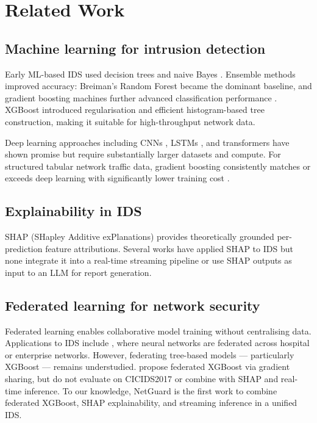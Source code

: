 \documentclass[review]{elsarticle}  %
\begin{document}
\section{Related Work}
\label{sec:related}

\subsection{Machine learning for intrusion detection}

Early ML-based IDS used decision trees and naive Bayes \cite{ref2}.
Ensemble methods improved accuracy: Breiman's Random Forest \cite{ref3}
became the dominant baseline, and gradient boosting machines further
advanced classification performance \cite{ref4}. XGBoost \cite{ref5}
introduced regularisation and efficient histogram-based tree construction,
making it suitable for high-throughput network data.

Deep learning approaches including CNNs \cite{ref6}, LSTMs \cite{ref7},
and transformers \cite{ref8} have shown promise but require substantially
larger datasets and compute. For structured tabular network traffic data,
gradient boosting consistently matches or exceeds deep learning with
significantly lower training cost \cite{ref9}.

\subsection{Explainability in IDS}

SHAP (SHapley Additive exPlanations) \cite{ref10} provides
theoretically grounded per-prediction feature attributions.
Several works have applied SHAP to IDS \cite{ref11,ref12} but
none integrate it into a real-time streaming pipeline or use
SHAP outputs as input to an LLM for report generation.

\subsection{Federated learning for network security}

Federated learning \cite{ref13} enables collaborative model
training without centralising data. Applications to IDS include
\cite{ref14,ref15}, where neural networks are federated across
hospital or enterprise networks. However, federating tree-based
models — particularly XGBoost — remains understudied.
\cite{ref16} propose federated XGBoost via gradient sharing,
but do not evaluate on CICIDS2017 or combine with SHAP and
real-time inference. To our knowledge, NetGuard is the first
work to combine federated XGBoost, SHAP explainability,
and streaming inference in a unified IDS.
\end{document}

